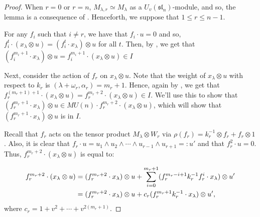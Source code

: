 \documentclass{amsart}
\numberwithin{equation}{section}
\theoremstyle{theorem}
\theoremstyle{definition}
\newcommand{\sll}{\mathfrak{sl}}
\newcommand{\uvsln}{U_v(\sll_n)}
\begin{document}
\begin{proof}
When $r=0$ or $r=n$, $M_{\lambda,r}\simeq M_{\lambda}$ as a $\uvsln$-module, and so, the lemma is a consequence of \cite[Lemma 5.4(b)]{J}. Henceforth, we suppose that $1\leq r\leq n-1$.

For any $f_i$ such that $i\neq r$, we have that $f_i\cdot u=0$ and so, $f_i^t\cdot (x_{\lambda}\otimes u) = (f_i^t\cdot x_{\lambda})\otimes u$ for all $t$. Then, by \cite[Lemma 5.4(b)]{J}, we get that $(f_i^{m_i+1} \cdot x_{\lambda})\otimes u=f_i^{m_i+1} \cdot (x_{\lambda}\otimes u) \in I$

Next, consider the action of $f_r$ on $x_{\lambda}\otimes u$. Note that the weight of $x_{\lambda}\otimes u$ with respect to $k_r$ is $(\lambda+\omega_r,\alpha_r)=m_r+1$. Hence, again by \cite[Lemma 5.4(b)]{J}, we get that $f_r^{(m_r+1)+1} \cdot (x_{\lambda}\otimes u)=f_r^{m_r+2} \cdot (x_{\lambda}\otimes u) \in I$. We'll use this to show that $(f_r^{m_r+1}\cdot x_{\lambda})\otimes u\in MU(n)\cdot f_r^{m_r+2}\cdot (x_{\lambda}\otimes u)$, which will show that $(f_r^{m_r+1}\cdot x_{\lambda})\otimes u$ is in $I$.

Recall that $f_r$ acts on the tensor product $M_{\lambda}\otimes W_r$ via $\rho(f_r)=k_r^{-1}\otimes f_r + f_r \otimes 1$. Also, it is clear that $f_r\cdot u = u_1\wedge u_2\wedge\cdots \wedge u_{r-1}\wedge u_{r+1} =: u'$ and that $f_r^2\cdot u =0$. Thus, $f_r^{m_r+2}\cdot (x_\lambda\otimes u)$ is equal to:

\begin{align}
\notag f_r^{m_r+2}\cdot (x_\lambda\otimes u)&=(f_r^{m_r+2} \cdot x_{\lambda})\otimes u+\sum_{i=0}^{m_r+1} (f_r^{m_r-i+1}k_r^{-1}f_r^{i} \cdot x_{\lambda})\otimes u'\\
\label{eq:fmr-dot-xu} &=(f_r^{m_r+2} \cdot x_{\lambda})\otimes u + c_r(f_r^{m_r+1} k_r^{-1} \cdot x_{\lambda})\otimes u',    
\end{align}
where $c_r=1+v^2+\cdots +v^{2(m_r+1)}$.


\end{proof}
\end{document}
